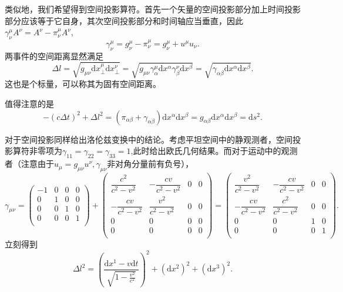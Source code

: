 \documentclass[11pt, a4paper, oneside, onecolumn]{ctexart}
\numberwithin{equation}{subsection}
\begin{document}
类似地，我们希望得到空间投影算符。首先一个矢量的空间投影部分加上时间投影部分应该等于它自身，其次空间投影部分和时间轴应当垂直，因此$\gamma^{\mu}_{\nu}A^{\nu}=A^{\nu}-\pi_{\nu}^{\mu}A^{\nu}$,
\begin{equation}
\gamma^{\mu}_{\nu}=g^{\mu}_{\nu}-\pi^{\mu}_{\nu}=g_{\nu}^{\mu}+u^{\mu}u_{\nu}.
\end{equation}
两事件的空间距离显然满足
\begin{equation}
\Delta{}l=\sqrt{g_{\mu\nu}\mathrm{d}x^{\mu}_{\bot}\mathrm{d}x^{\nu}_{\bot}}=\sqrt{g_{\mu\nu}\gamma^{\mu}_{\alpha}\mathrm{d}x^{\alpha}\gamma^{\nu}_{\beta}\mathrm{d}x^{\beta}}=\sqrt{\gamma_{\alpha\beta}\mathrm{d}x^{\alpha}\mathrm{d}x^{\beta}}.\label{2.1.11}
\end{equation}
这也是个标量，可以称其为固有空间距离。

值得注意的是
\begin{equation}
-\left(c\Delta{}t\right)^{2}+\Delta{}l^{2}=\left(\pi_{\alpha\beta}+\gamma_{\alpha\beta}\right)\mathrm{d}x^{\alpha}\mathrm{d}x^{\beta}=g_{\alpha\beta}\mathrm{d}x^{\alpha}\mathrm{d}x^{\beta}=\mathrm{d}s^{2}.
\end{equation}

对于空间投影同样给出洛伦兹变换中的结论。考虑平坦空间中的静观测者，空间投影算符非零项为$\gamma_{11}=\gamma_{22}=\gamma_{33}=1$,此时给出欧氏几何结果。而对于运动中的观测者（注意由于$u_{\mu}=g_{\mu\nu}u^{\nu},\gamma_{\mu\nu}$非对角分量前有负号），
\begin{equation}
\gamma_{\mu\nu}=\begin{pmatrix}
-1 & 0 & 0 & 0\\
0 & 1 & 0 & 0\\
0 & 0 & 1 & 0\\
0 & 0 & 0 & 1\\
\end{pmatrix}+
\begin{pmatrix}
\dfrac{c^{2}}{c^{2}-v^{2}} & -\dfrac{cv}{c^{2}-v^{2}} & 0 & 0\\
-\dfrac{cv}{c^{2}-v^{2}} & \dfrac{v^{2}}{c^{2}-v^{2}} & 0 & 0\\
0 & 0 & 0 & 0\\
0 & 0 & 0 & 0\\
\end{pmatrix}=
\begin{pmatrix}
\dfrac{v^{2}}{c^{2}-v^{2}} & -\dfrac{cv}{c^{2}-v^{2}} & 0 & 0\\
-\dfrac{cv}{c^{2}-v^{2}} & \dfrac{c^{2}}{c^{2}-v^{2}} & 0 & 0\\
0 & 0 & 1 & 0\\
0 & 0 & 0 & 1\\
\end{pmatrix}.
\end{equation}
立刻得到
\begin{equation}
\Delta{}l^{2}=\left(\frac{\mathrm{d}x^{1}-v\mathrm{d}t}{\sqrt{1-\frac{v^{2}}{c^{2}}}}\right)^{2}+\left(\mathrm{d}x^{2}\right)^{2}+\left(\mathrm{d}x^{3}\right)^{2}.
\end{equation}
\end{document}
